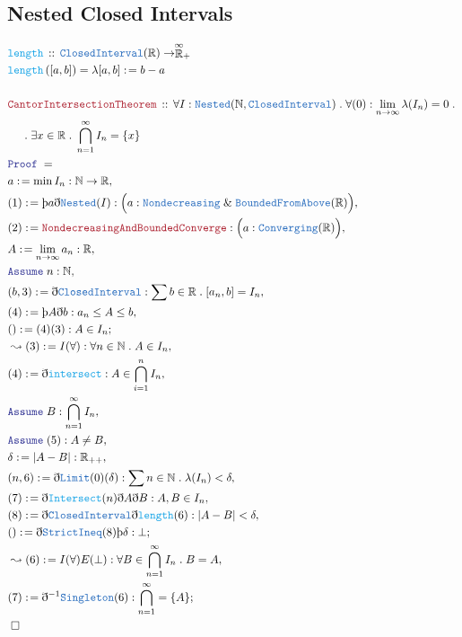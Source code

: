 \documentclass[12pt]{scrartcl}
\newcommand{\TYPE}[1]{\textcolor{NavyBlue}{\mathtt{#1}}}
\newcommand{\FUNC}[1]{\textcolor{Cerulean}{\mathtt{#1}}}
\newcommand{\LOGIC}[1]{\textcolor{Blue}{\mathtt{#1}}}
\newcommand{\THM}[1]{\textcolor{Maroon}{\mathtt{#1}}}
\renewcommand{\.}{\; . \;}
\newcommand{\de}{: \kern 0.1pc =}
\newcommand{\Act}[1]{\left( #1 \right)}
\newcommand{\Theorem}[2]{& \THM{#1} \, :: \, #2 \\ & \Proof = \\ }
\newcommand{\DeclareFunc}[2]{& \FUNC{#1} \, :: \, #2 \\}
\newcommand{\DefineNamedFunc}[4]{&  \FUNC{#1}\Act{#2} = #3 \de #4 \\}
\newcommand{\NewLine}{\\ & \kern 1pc}
\newcommand{\Page}[1]{ \begin{align*} #1 \end{align*}   }
\newcommand{ \bd }{ \ByDef }
\renewcommand{\And}{\; \& \;}
\newcommand{\Reals}{\mathbb{R} }
\newcommand{\Nat}{\mathbb{N} }
\newcommand{\EReals}{\stackrel{\mathclap{\infty}}{\mathbb{R}}}
\newcommand{\Say}[3]{& #1 \de #2 : #3, \\}
\newcommand{\Conclude}[3]{& #1 \de #2 : #3; \\}
\newcommand{\Derive}[3]{& \leadsto #1 \de #2 : #3, \\}
\newcommand{\Assume}[2]{& \LOGIC{Assume} \;#1 : #2, \\}
\newcommand{\QED}{\; \square}
\newcommand{\EndProof}{& \QED \\}
\newcommand{\ByDef}{\eth}
\newcommand{\ByConstr}{\text{\thorn}}
\newcommand{\Proof}{\LOGIC{Proof} \; }
\begin{document}
\subsection{Nested Closed Intervals}
\Page{
	\DeclareFunc{length}{\TYPE{ClosedInterval}(\Reals) \to \EReals_+}
	\DefineNamedFunc{length}{[a,b]}{ \lambda [a,b]  }{b - a}
	\\
	\Theorem{CantorIntersectionTheorem}{\forall I :  \TYPE{Nested}(\Nat,  \TYPE{ClosedInterval})  
		\. \forall (0) : \lim_{n \to \infty} \lambda(I_n) = 0 \.
		\NewLine \.
		\exists x \in \Reals \. \bigcap_{n = 1}^\infty I_n = \{x\}
	}
	\Say{a}{\min I_n}{\Nat \to \Reals}
	\Say{(1)}{\ByConstr a \bd \TYPE{Nested}(I)}{ \Big( a : \TYPE{Nondecreasing} \And \TYPE{BoundedFromAbove}(\Reals) \Big) }
	\Say{(2)}{\THM{NondecreasingAndBoundedConverge}}{ \Big( a : \TYPE{Converging}(\Reals) \Big)   }
	\Say{A}{\lim_{n \to \infty} a_n}{\Reals}
	\Assume{n}{\Nat}
	\Say{(b,3)}{\bd \TYPE{ClosedInterval}}{ \sum b \in \Reals \. [a_n,b] = I_n }
	\Say{(4)}{\ByConstr A \bd b}{ a_n \le A \le b   }
	\Conclude{()}{(4)(3)}{ A \in  I_n     }
	\Derive{(3)}{I(\forall)}{\forall n \in \Nat \.  A \in I_n}
	\Say{(4)}{\bd \FUNC{intersect}}{ A \in \bigcap^n_{i=1} I_n}
	\Assume{B}{\bigcap^\infty_{n=1} I_n}
	\Assume{(5)}{A \neq B}
	\Say{\delta}{|A - B|}{\Reals_{++}}
	\Say{(n,6)}{\bd \TYPE{Limit}(0)(\delta)}{\sum n \in \Nat \. \lambda(I_n) < \delta }
	\Say{(7)}{\bd \FUNC{Intersect}(n)\bd A \bd B }{ A,B \in I_n }
	\Say{(8)}{ \bd \TYPE{ClosedInterval} \bd \FUNC{length}(6) }{ |A - B| < \delta   }
	\Conclude{()}{ \bd \TYPE{StrictIneq}(8) \ByConstr \delta  }{ \bot  }
	\Derive{(6)}{I(\forall)E(\bot)}{\forall B \in \bigcap^\infty_{n=1} I_n \. B = A}
	\Conclude{(7)}{\bd^{-1}\TYPE{Singleton}(6)}{\bigcap^\infty_{n=1} = \{A\}}
	\EndProof
}
\newpage
\end{document}
